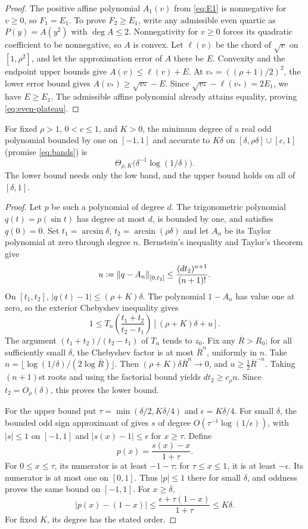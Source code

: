 \begin{proof}
The positive affine polynomial $A_1(v)$ from \eqref{eq:E1} is nonnegative for $v\geq0$, so $F_1=E_1$. To prove $F_2\geq E_1$, write any admissible even quartic as $P(y)=A(y^2)$ with $\deg A\leq2$. Nonnegativity for $v\geq0$ forces its quadratic coefficient to be nonnegative, so $A$ is convex. Let $\ell(v)$ be the chord of $\sqrt v$ on $[1,\rho^2]$, and let the approximation error of $A$ there be $E$. Convexity and the endpoint upper bounds give $A(v)\leq\ell(v)+E$. At $v_*=((\rho+1)/2)^2$, the lower error bound gives $A(v_*)\geq\sqrt{v_*}-E$. Since $\sqrt{v_*}-\ell(v_*)=2E_1$, we have $E\geq E_1$. The admissible affine polynomial already attains equality, proving \eqref{eq:even-plateau}.
\end{proof}

\begin{proposition}\label{prop:odd-optimal}
For fixed $\rho>1$, $0<c\leq1$, and $K>0$, the minimum degree of a real odd polynomial bounded by one on $[-1,1]$ and accurate to $K\delta$ on $[\delta,\rho\delta]\cup[c,1]$ (promise \eqref{eq:bands}) is
\[
 \Theta_{\rho,K}\bigl(\delta^{-1}\log(1/\delta)\bigr).
\]
The lower bound needs only the low band, and the upper bound holds on all of $[\delta,1]$.
\end{proposition}
\begin{proof}
Let $p$ be such a polynomial of degree $d$. The trigonometric polynomial $q(t)=p(\sin t)$ has degree at most $d$, is bounded by one, and satisfies $q(0)=0$. Set $t_1=\arcsin\delta$, $t_2=\arcsin(\rho\delta)$ and let $A_n$ be its Taylor polynomial at zero through degree $n$. Bernstein's inequality and Taylor's theorem give
\[
 u:=\left\lVert q-A_n\right\rVert_{[0,t_2]}
 \leq\frac{(dt_2)^{n+1}}{(n+1)!}.
\]
On $[t_1,t_2]$, $|q(t)-1|\leq(\rho+K)\delta$. The polynomial $1-A_n$ has value one at zero, so the exterior Chebyshev inequality gives
\[
 1\leq T_n\left(\frac{t_1+t_2}{t_2-t_1}\right)
            [(\rho+K)\delta+u].
\]
The argument $(t_1+t_2)/(t_2-t_1)$ of $T_n$ tends to $z_0$. Fix any $\overline R>R_0$; for all sufficiently small $\delta$, the Chebyshev factor is at most $\overline R^n$, uniformly in $n$. Take
$n=\lfloor\log(1/\delta)/(2\log\overline R)\rfloor$.
Then $(\rho+K)\delta\overline R^n\to0$, and $u\geq\tfrac12\overline R^{-n}$. Taking $(n+1)$st roots and using the factorial bound yields $dt_2\geq c_\rho n$. Since $t_2=O_\rho(\delta)$, this proves the lower bound.

For the upper bound put $\tau=\min(\delta/2,K\delta/4)$ and $\epsilon=K\delta/4$. For small $\delta$, the bounded odd sign approximant of \cite[Lemma 25, extended version]{gilyen2019} gives $s$ of degree $O(\tau^{-1}\log(1/\epsilon))$, with $|s|\leq1$ on $[-1,1]$ and $|s(x)-1|\leq\epsilon$ for $x\geq\tau$. Define
\[
 p(x)=\frac{s(x)-x}{1+\tau}.
\]
For $0\leq x\leq\tau$, its numerator is at least $-1-\tau$; for $\tau\leq x\leq1$, it is at least $-\epsilon$. Its numerator is at most one on $[0,1]$. Thus $|p|\leq1$ there for small $\delta$, and oddness proves the same bound on $[-1,1]$. For $x\geq\delta$,
\[
 |p(x)-(1-x)|\leq\frac{\epsilon+\tau(1-x)}{1+\tau}
 \leq K\delta.
\]
For fixed $K$, its degree has the stated order.
\end{proof}

